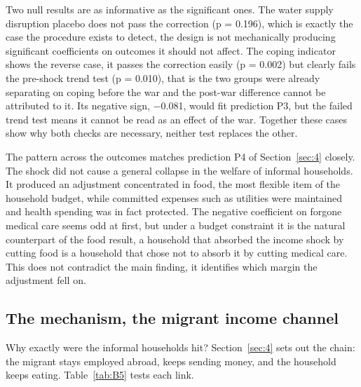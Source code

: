 Two null results are as informative as the significant ones. The water supply disruption placebo does not pass the correction (p = 0.196), which is exactly the case the procedure exists to detect, the design is not mechanically producing significant coefficients on outcomes it should not affect. The coping indicator shows the reverse case, it passes the correction easily (p = 0.002) but clearly fails the pre-shock trend test (p = 0.010), that is the two groups were already separating on coping before the war and the post-war difference cannot be attributed to it. Its negative sign, $-$0.081, would fit prediction P3, but the failed trend test means it cannot be read as an effect of the war. Together these cases show why both checks are necessary, neither test replaces the other.

The pattern across the outcomes matches prediction P4 of Section~\ref{sec:4} closely. The shock did not cause a general collapse in the welfare of informal households. It produced an adjustment concentrated in food, the most flexible item of the household budget, while committed expenses such as utilities were maintained and health spending was in fact protected. The negative coefficient on forgone medical care seems odd at first, but under a budget constraint it is the natural counterpart of the food result, a household that absorbed the income shock by cutting food is a household that chose not to absorb it by cutting medical care. This does not contradict the main finding, it identifies which margin the adjustment fell on.

\subsection{The mechanism, the migrant income channel}\label{sec:7-4}

Why exactly were the informal households hit? Section~\ref{sec:4} sets out the chain: the migrant stays employed abroad, keeps sending money, and the household keeps eating. Table~\ref{tab:B5} tests each link.

